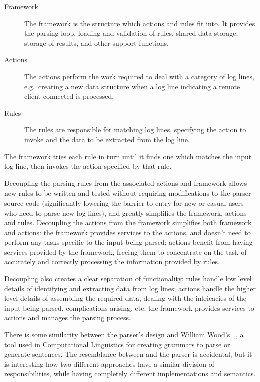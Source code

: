\documentclass[draft]{svmult}
\begin{document}
\begin{description}

    \item [Framework]  The framework is the structure which actions and
        rules fit into.  It provides the parsing loop, loading and
        validation of rules, shared data storage, storage of results, and
        other support functions.

    \item [Actions]  The actions perform the work required to deal with a
        category of log lines, e.g.\ creating a new data structure when a
        log line indicating a remote client connected is processed.

    \item [Rules]  The rules are responsible for matching log lines,
        specifying the action to invoke and the data to be extracted from
        the log line.

\end{description}

The framework tries each rule in turn until it finds one which matches the
input log line, then invokes the action specified by that rule.

Decoupling the parsing rules from the associated actions and framework
allows new rules to be written and tested without requiring modifications
to the parser source code (significantly lowering the barrier to entry for
new or casual users who need to parse new log lines), and greatly
simplifies the framework, actions and rules. Decoupling the actions from
the framework simplifies both framework and actions: the framework provides
services to the actions, and doesn't need to perform any tasks specific to
the input being parsed; actions benefit from having services provided by
the framework, freeing them to concentrate on the task of accurately and
correctly processing the information provided by rules.

Decoupling also creates a clear separation of functionality: rules handle
low level details of identifying and extracting data from log lines;
actions handle the higher level details of assembling the required data,
dealing with the intricacies of the input being parsed, complications
arising, etc; the framework provides services to actions and manages the
parsing process.

There is some similarity between the parser's design and William Wood's
\ATN{}~\cite{atns, nlpip}, a tool used in Computational Linguistics for
creating grammars to parse or generate sentences.  The resemblance between
\ATN{} and the parser is accidental, but it is interesting how two
different approaches have a similar division of responsibilities, while
having completely different implementations and semantics.
\end{document}
